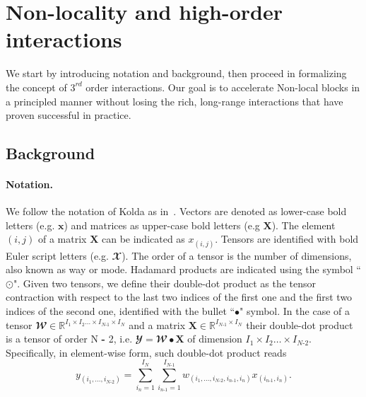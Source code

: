 \documentclass[10pt,twocolumn,letterpaper]{article}
\begin{document}
\section{Non-locality and high-order interactions\vspace{-0.1cm}}
We start by introducing notation and background, then proceed in formalizing the concept of $3^{rd}$ order interactions. Our goal is to accelerate Non-local blocks in a principled manner without losing the rich, long-range interactions that have proven successful in practice. 

\subsection{Background}
\label{sec:background}
\paragraph{Notation.}{We follow the notation of Kolda \etal as in~\cite{kolda2009tensor}. Vectors are denoted as lower-case bold letters (e.g. $\mathbf{x}$) and matrices as upper-case bold letters (e.g $\mathbf{X}$). The element $(i,j)$ of a matrix $\mathbf{X}$ can be indicated as $x_{(i,j)}$. Tensors are identified with bold Euler script letters (e.g. $\mathbfcal{X}$). The order of a tensor is the number of dimensions, also known as way or mode. Hadamard products are indicated using the symbol ``$\odot$". Given two tensors, we define their double-dot product as the tensor contraction with respect to the last two indices of the first one and the first two indices of the second one, identified with the bullet ``$\bullet$" symbol. In the case of a tensor $\mathbfcal{W} \in \mathbb{R}^{I_{1} \times I_{2} \dots \times I_{N \text{-} 1} \times I_{N}}$ and a matrix $\mathbf{X} \in \mathbb{R}^{I_{N \text{-} 1} \times I_{N}} $ their double-dot product is a tensor of order {N \textbf{-} 2}, i.e. $\mathbfcal{Y}=\mathbfcal{W} \bullet \mathbf{X}$ of dimension $I_{1} \times I_{2} \dots \times I_{N \text{-} 2}$. Specifically, in element-wise form, such double-dot product reads  
$$y_{(i_{1},\dots,i_{N \text{-} 2})} = \sum\limits_{i_{n}=1}^{I_{N}} \sum\limits_{i_{n \text{-} 1}=1}^{I_{N \text{-} 1}} w_{(i_{1},\dots,i_{N \text{-} 2},i_{n \text{-} 1},i_{n})} x_{(i_{n \text{-} 1},i_{n})}.$$ \vspace{-0.8cm}\\}
\end{document}
